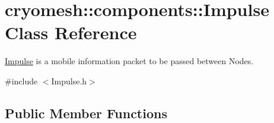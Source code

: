 \hypertarget{classcryomesh_1_1components_1_1Impulse}{\section{cryomesh\-:\-:components\-:\-:\-Impulse \-Class \-Reference}
\label{classcryomesh_1_1components_1_1Impulse}
}


\hyperlink{classcryomesh_1_1components_1_1Impulse}{\-Impulse} is a mobile information packet to be passed between \-Nodes.  




{\ttfamily \#include $<$\-Impulse.\-h$>$}

\subsection*{\-Public \-Member \-Functions}
